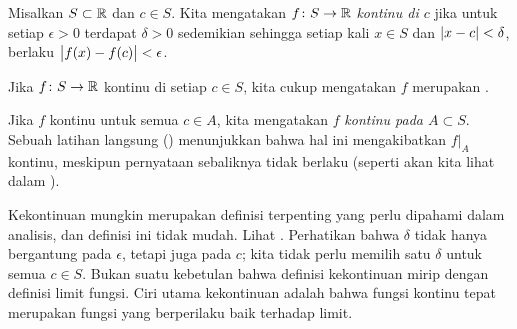 \begin{defn}
Misalkan $S \subset {\mathbb{R}}$ dan $c \in S$.
Kita mengatakan $f \colon S \to {\mathbb{R}}$
\emph{kontinu di $c$}
jika untuk setiap $\epsilon > 0$
terdapat $\delta > 0$ sedemikian sehingga setiap kali $x \in S$ dan $\sabs{x-c} <
\delta$, berlaku
$\bigl\lvert {f(x)-f(c)} \bigr\rvert < \epsilon$.


Jika $f \colon S \to {\mathbb{R}}$ kontinu di setiap $c \in S$, kita cukup mengatakan
$f$ merupakan \emph{}.
\end{defn}
\begin{myfigureht}
\caption{Untuk $\sabs{x-c} < \delta$, grafik $f(x)$ harus berada di dalam daerah abu-abu.\label{fig:contigr}}
\end{myfigureht}

Jika $f$ kontinu untuk semua $c \in A$, kita mengatakan
$f$ \emph{kontinu pada $A \subset S$}.  Sebuah
latihan langsung ()
menunjukkan bahwa hal ini mengakibatkan $f|_A$ kontinu, meskipun
pernyataan sebaliknya tidak berlaku (seperti akan kita lihat dalam ).

Kekontinuan mungkin merupakan definisi terpenting yang perlu dipahami dalam analisis,
dan definisi ini tidak mudah.  Lihat .
Perhatikan bahwa $\delta$ tidak hanya bergantung
pada $\epsilon$, tetapi juga pada $c$; kita tidak perlu memilih
satu $\delta$ untuk semua $c \in S$.
Bukan suatu kebetulan
bahwa definisi kekontinuan mirip dengan definisi
limit fungsi.  Ciri utama kekontinuan
adalah bahwa fungsi kontinu tepat merupakan fungsi yang berperilaku baik terhadap limit.

